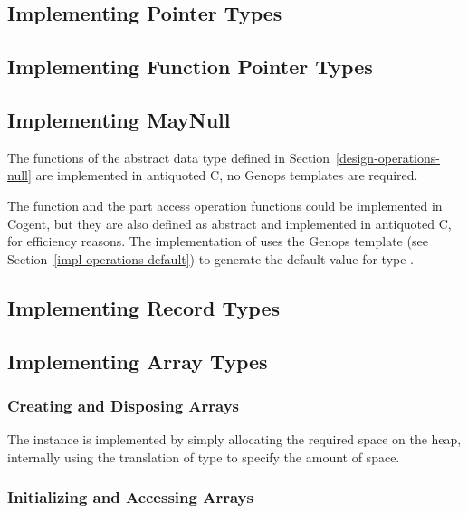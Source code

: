 \subsection{Implementing Pointer Types}
\label{impl-operations-pointer}

\subsection{Implementing Function Pointer Types}
\label{impl-operations-function}

\subsection{Implementing MayNull}
\label{impl-operations-null}

The functions of the abstract data type defined in Section~\ref{design-operations-null} are implemented in antiquoted
C, no Genops templates are required. 

The function  and the part access operation functions could be implemented in Cogent, but they are also 
defined as abstract and implemented in antiquoted C, for efficiency reasons. The implementation of 
uses the Genops template  (see Section~\ref{impl-operations-default}) to generate the default value
for type .

\subsection{Implementing Record Types}
\label{impl-operations-record}

\subsection{Implementing Array Types}
\label{impl-operations-array}

\subsubsection{Creating and Disposing Arrays}

The  instance is implemented by simply allocating the
required space on the heap, internally using the translation of type  to specify
the amount of space. 

\subsubsection{Initializing and Accessing Arrays}

